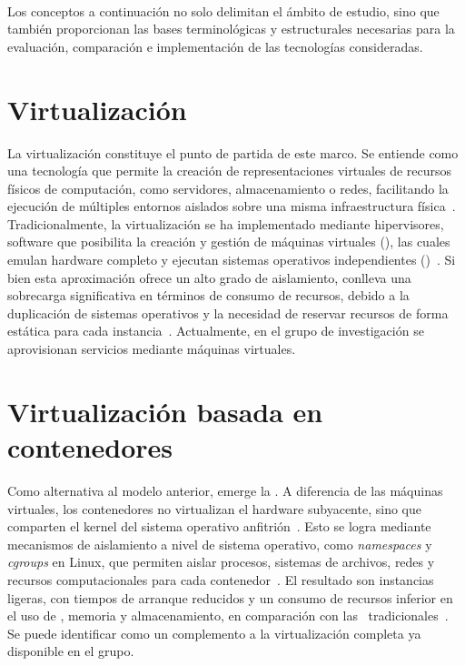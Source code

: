 \label{cap:marcoConceptual}
\mbox{}\\
Los conceptos a continuación no solo delimitan el ámbito de estudio, sino que también proporcionan las bases terminológicas y estructurales necesarias para la evaluación, comparación e implementación de las tecnologías consideradas. 

\section{Virtualización}
La virtualización constituye el punto de partida de este marco. Se entiende como una tecnología que permite la creación de representaciones virtuales de recursos físicos de computación, como servidores, almacenamiento o redes, facilitando la ejecución de múltiples entornos aislados sobre una misma infraestructura física~\citep{AmazonWebServicesInc2023}. Tradicionalmente, la virtualización se ha implementado mediante hipervisores, software que posibilita la creación y gestión de máquinas virtuales (\VM), las cuales emulan hardware completo y ejecutan sistemas operativos independientes (\OS)~\citep{KLEIDERMACHER201225}. Si bien esta aproximación ofrece un alto grado de aislamiento, conlleva una sobrecarga significativa en términos de consumo de recursos, debido a la duplicación de sistemas operativos y la necesidad de reservar recursos de forma estática para cada instancia~\citep{bauman2015survey}. Actualmente, en el grupo de investigación se aprovisionan servicios mediante máquinas virtuales.

\section{Virtualización basada en contenedores}
Como alternativa al modelo anterior, emerge la \VBC. A diferencia de las máquinas virtuales, los contenedores no virtualizan el hardware subyacente, sino que comparten el kernel del sistema operativo anfitrión~\citep{eder2016hypervisor}. Esto se logra mediante mecanismos de aislamiento a nivel de sistema operativo, como \textit{namespaces} y \textit{cgroups} en Linux, que permiten aislar procesos, sistemas de archivos, redes y recursos computacionales para cada contenedor~\citep{jain2020linux}. El resultado son instancias ligeras, con tiempos de arranque reducidos y un consumo de recursos inferior en el uso de \CPU\;, memoria y almacenamiento, en comparación con las \VM\ tradicionales~\citep{6903537}. Se puede identificar como un complemento a la virtualización completa ya disponible en el grupo.

